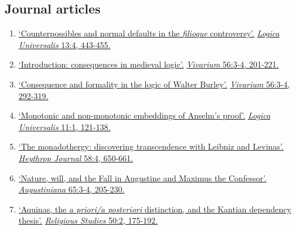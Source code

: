 \subsection{Journal articles}
\begin{enumerate}
	\setcounter{enumi}{\value{publicationCounter}}	%
	\item {}
{%
	\href{https://www.academia.edu/41385588/Counterpossibles_and_Normal_Defaults_in_the_Filioque_Controversy}{`Counterpossibles and normal defaults in the \emph{filioque} controversy'.} \href{https://link.springer.com/article/10.1007\%2Fs11787-019-00229-x}{\emph{Logica Universalis} 13:4, 443-455.}
}
{}
	\item {}
{}
{
	\href{https://www.academia.edu/38134285/Introduction_Consequences_in_Medieval_Logic}{`Introduction: consequences in medieval logic'.} \href{https://brill.com/view/journals/viv/56/3-4/article-p201_1.xml?language=en}{\emph{Vivarium} 56:3-4, 201-221.}}
{}
	\item \datedsubsectionnarrow{}
{}
{
	\href{https://www.academia.edu/38134091/Consequence_and_formality_in_the_logic_of_Walter_Burley}{`Consequence and formality in the logic of Walter Burley'.} \href{https://brill.com/view/journals/viv/56/3-4/article-p292_5.xml?language=en}{\emph{Vivarium} 56:3-4, 292-319.}}
{}
	\item {}
{}
{
	\href{https://www.academia.edu/29444391/Monotonic_and_non_monotonic_embeddings_of_Anselms_proof}{`Monotonic and non-monotonic embeddings of Anselm's proof'.} \href{https://link.springer.com/article/10.1007/s11787-017-0162-7}{\emph{Logica Universalis} 11:1, 121-138.}}
{}
	\item \datedsubsectionnarrow{}
{}
{
	\href{https://www.academia.edu/14431957/The_monadothergy_discovering_transcendence_with_Leibniz_and_Levinas}{`The monadothergy: discovering transcendence with Leibniz and Levinas'.} \href{https://onlinelibrary.wiley.com/doi/abs/10.1111/heyj.12497}{\emph{Heythrop Journal} 58:4, 650-661.}
}
{}
	\item {}
{}
{
	\href{https://www.academia.edu/19927006/Nature_will_and_the_Fall_in_Augustine_and_Maximus_the_Confessor}{`Nature, will, and the Fall in Augustine and Maximus the Confessor'.} \href{https://poj.peeters-leuven.be/content.php?url=article\&id=3144290\&download=yes}{\emph{Augustiniana} 65:3-4, 205-230.}}
{}
	\item {}
{}
{
	\href{https://www.academia.edu/6326310/Aquinas_the_a_priori_a_posteriori_distinction_and_the_Kantian_dependency_thesis}{`Aquinas, the \emph{a priori/a posteriori} distinction, and the Kantian dependency thesis'.} \href{https://www.cambridge.org/core/journals/religious-studies/article/abs/aquinas-the-a-prioria-posteriori-distinction-and-the-kantian-dependency-thesis/E54AA5D031B1465696DB67ADB84F4812}{\emph{Religious Studies} 50:2, 175-192.}}
{}

	\setcounter{publicationCounter}{\value{enumi}}	%
\end{enumerate}
